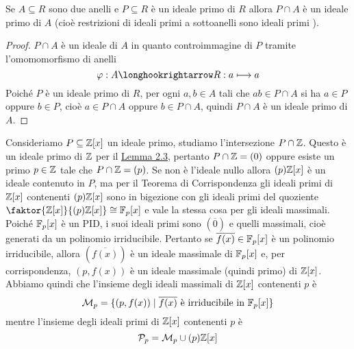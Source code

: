 \documentclass[11pt]{scrartcl}
\begin{document}
\begin{lemma}
    \label{lemma2.3}
    Se $A \subseteq R$ sono due anelli e $P \subseteq R$ è un ideale primo
    di $R$ allora $P\cap A$ è un ideale primo di $A$ (cioè restrizioni di ideali primi a sottoanelli sono ideali primi  ).
\end{lemma}

\begin{proof}
    $P\cap A$ è un ideale di $A$ in quanto controimmagine di $P$ tramite
    l'omomomorfismo di anelli
    \[
        \varphi: A \longhookrightarrow R: a \longmapsto a
    \]
    Poiché $P$ è un ideale primo di $R$, per ogni $a, b \in A$ tali che 
    $ab \in P\cap A$ si ha $a \in P$
    oppure $b \in P$, cioè $a \in P \cap A$ oppure $b \in P\cap A$, quindi
    $P \cap A$ è un ideale primo di $A$.
\end{proof}


Consideriamo $P \subseteq \mathbb Z[x]$ un ideale primo, studiamo l'intersezione
$P \cap \mathbb Z$. Questo è un ideale primo di $\mathbb Z$ per il 
\hyperref[lemma2.3]{Lemma 2.3}, pertanto $P\cap \mathbb Z = (0)$ oppure esiste un
primo $p \in \mathbb Z$ tale che $P\cap\mathbb Z = (p)$. Se non è l'ideale nullo allora
$(p)\mathbb Z[x]$ è un ideale contenuto in $P$, ma per il Teorema di 
Corrispondenza gli ideali primi di $\mathbb Z[x]$ contenenti $(p)\mathbb Z[x]$ sono in 
bigezione con gli ideali primi del quoziente $\faktor{\ZZ[x]}{(p)\ZZ[x]} \cong \FF_p[x]$
e vale la stessa cosa per gli ideali massimali. 
Poiché $\mathbb F_p[x]$ è un PID, i suoi ideali primi sono $(\overline{0})$ e quelli massimali, 
cioè generati da un polinomio irriducibile.
Pertanto se $\overline{f(x)} \in \mathbb F_p[x]$ è un polinomio irriducibile, 
allora $(\overline{f(x)})$ è un ideale massimale di $\mathbb F_p[x]$
e, per corrispondenza, $(p, f(x))$ è un ideale massimale (quindi primo) di $\mathbb Z[x]$. 
Abbiamo quindi che l'insieme degli ideali massimali di $\mathbb Z[x]$ contenenti $p$ è
\[
    \mathcal{M}_p = \{(p, f(x))\mid \overline{f(x)}\text{ è irriducibile in }
    \mathbb F_p[x]\}
\]
mentre l'insieme degli ideali primi di $\mathbb Z[x]$ contenenti $p$ è
\[
    \mathcal{P}_p = \mathcal{M}_p \cup (p)\mathbb Z[x]
\]
\end{document}
